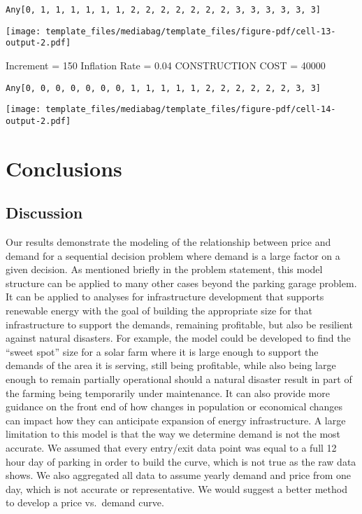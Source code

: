 \documentclass[
  letterpaper,
  DIV=11,
  numbers=noendperiod]{scrartcl}
\begin{document}
\begin{verbatim}
Any[0, 1, 1, 1, 1, 1, 1, 2, 2, 2, 2, 2, 2, 2, 3, 3, 3, 3, 3, 3]
\end{verbatim}

\texttt{[image: template\_files/mediabag/template\_files/figure-pdf/cell-13-output-2.pdf]}

Increment = 150 Inflation Rate = 0.04 CONSTRUCTION COST = 40000

\begin{verbatim}
Any[0, 0, 0, 0, 0, 0, 0, 1, 1, 1, 1, 1, 2, 2, 2, 2, 2, 2, 3, 3]
\end{verbatim}

\texttt{[image: template\_files/mediabag/template\_files/figure-pdf/cell-14-output-2.pdf]}

\section{Conclusions}\label{conclusions}

\subsection{Discussion}\label{discussion}

Our results demonstrate the modeling of the relationship between price
and demand for a sequential decision problem where demand is a large
factor on a given decision. As mentioned briefly in the problem
statement, this model structure can be applied to many other cases
beyond the parking garage problem. It can be applied to analyses for
infrastructure development that supports renewable energy with the goal
of building the appropriate size for that infrastructure to support the
demands, remaining profitable, but also be resilient against natural
disasters. For example, the model could be developed to find the ``sweet
spot'' size for a solar farm where it is large enough to support the
demands of the area it is serving, still being profitable, while also
being large enough to remain partially operational should a natural
disaster result in part of the farming being temporarily under
maintenance. It can also provide more guidance on the front end of how
changes in population or economical changes can impact how they can
anticipate expansion of energy infrastructure. A large limitation to
this model is that the way we determine demand is not the most accurate.
We assumed that every entry/exit data point was equal to a full 12 hour
day of parking in order to build the curve, which is not true as the raw
data shows. We also aggregated all data to assume yearly demand and
price from one day, which is not accurate or representative. We would
suggest a better method to develop a price vs.~demand curve.
\end{document}
